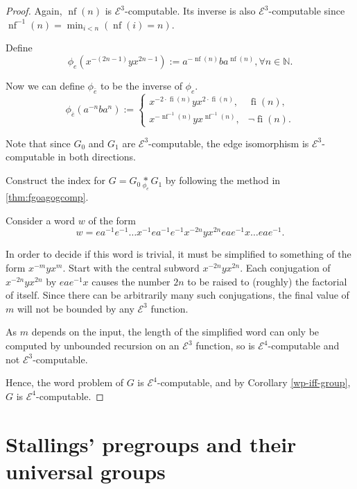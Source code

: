 \documentclass[a4paper]{article}
\newcommand{\grz}[1]{$\mathcal{E}^{#1}$}	%
\newcommand{\NN}{\mathbb{N}}	%
\theoremstyle{plain}
\theoremstyle{definition}
\begin{document}
\begin{proof}
Again, $\operatorname{nf}(n)$ is \grz{3}-computable. Its inverse is also \grz{3}-computable since $\operatorname{nf}^{-1}(n) = \min_{i<n} (\operatorname{nf}(i) = n)$.

Define
\[ \phi_{e}(x^{-(2n-1)}yx^{2n-1}) := a^{-\operatorname{nf}(n)}ba^{\operatorname{nf}(n)}, \forall n \in \NN. \]

Now we can define $\phi_{\bar{e}}$ to be the inverse of $\phi_e$.
\[ 
	\phi_{\bar{e}}(a^{-n}ba^n) := 
		\begin{cases}
			x^{-2 \cdot \operatorname{fi}(n)}yx^{2 \cdot \operatorname{fi}(n)}, & \operatorname{fi}(n), \\
			x^{-\operatorname{nf}^{-1}(n)}yx^{\operatorname{nf}^{-1}(n)}, & \neg \operatorname{fi}(n).
		\end{cases}
\]

Note that since $G_0$ and $G_1$ are \grz{3}-computable, the edge isomorphism is \grz{3}-computable in both directions.

Construct the index for $G = G_0 \underset{\phi_e}{\ast} G_1$ by following the method in \ref{thm:fgoagogcomp}.

Consider a word $w$ of the form
\[ w = ea^{-1}e^{-1} \dots x^{-1}ea^{-1}e^{-1}x^{-2n}yx^{2n}eae^{-1}x \dots eae^{-1}. \]

In order to decide if this word is trivial, it must be simplified to something of the form $x^{-m}yx^m$. Start with the central subword $x^{-2n}yx^{2n}$. Each conjugation of $x^{-2n}yx^{2n}$ by $eae^{-1}x$ causes the number $2n$ to be raised to (roughly) the factorial of itself. 
Since there can be arbitrarily many such conjugations, the final value of $m$ will not be bounded by any \grz{3} function.

As $m$ depends on the input, the length of the simplified word can only be computed by unbounded recursion on an \grz{3} function, so is \grz{4}-computable and not \grz{3}-computable. 

Hence, the word problem of $G$ is \grz{4}-computable, and by Corollary \ref{wp-iff-group}, $G$ is \grz{4}-computable. 
\end{proof}

\section{Stallings' pregroups and their universal groups}
\label{sec:pregroup}
\end{document}
